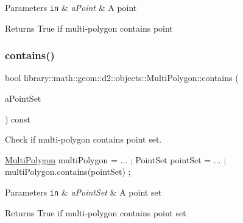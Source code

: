 \begin{DoxyParams}[1]{Parameters}
\mbox{\tt in}  & {\em a\+Point} & A point \\
\hline
\end{DoxyParams}
\begin{DoxyReturn}{Returns}
True if multi-\/polygon contains point 
\end{DoxyReturn}
\mbox{\label{classlibrary_1_1math_1_1geom_1_1d2_1_1objects_1_1_multi_polygon_a3a123cc4ebd6d157c1774176054617b6}} 
\subsubsection{\texorpdfstring{contains()}{contains()}\hspace{0.1cm}{\footnotesize\ttfamily [2/2]}}
{\footnotesize\ttfamily bool library\+::math\+::geom\+::d2\+::objects\+::\+Multi\+Polygon\+::contains (\begin{DoxyParamCaption}\item[{const \hyperlink{classlibrary_1_1math_1_1geom_1_1d2_1_1objects_1_1_point_set}{Point\+Set} \&}]{a\+Point\+Set }\end{DoxyParamCaption}) const}



Check if multi-\/polygon contains point set. 


\begin{DoxyCode}
\hyperlink{classlibrary_1_1math_1_1geom_1_1d2_1_1objects_1_1_multi_polygon_a10c2390027c64a8541efde7fcb2b282f}{MultiPolygon} multiPolygon = ... ;
PointSet pointSet = ... ;
multiPolygon.contains(pointSet) ;
\end{DoxyCode}



\begin{DoxyParams}[1]{Parameters}
\mbox{\tt in}  & {\em a\+Point\+Set} & A point set \\
\hline
\end{DoxyParams}
\begin{DoxyReturn}{Returns}
True if multi-\/polygon contains point set 
\end{DoxyReturn}
\mbox{\label{classlibrary_1_1math_1_1geom_1_1d2_1_1objects_1_1_multi_polygon_ac2a7a8791732ddd249a2bee8d476b7ae}} 
